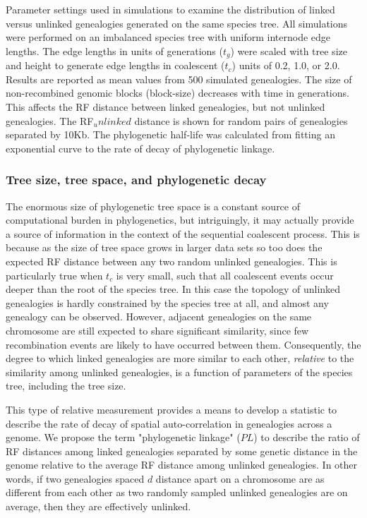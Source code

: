 \documentclass[11pt]{article}
\begin{document}
\begin{table}
\begin{center}
\end{center}
\caption{
	Parameter settings used in simulations to examine the distribution of 
	linked versus unlinked genealogies generated on the same species tree.
	All simulations were performed on an imbalanced species tree with uniform 
	internode edge lengths. The edge lengths in units of generations ($t_g$) 
	were scaled with tree size and height to generate edge lengths in 
	coalescent ($t_c$) units of 0.2, 1.0, or 2.0. Results are reported as mean values from 500 simulated 
	genealogies. The size of non-recombined genomic	blocks (block-size) decreases with time in generations. This affects the RF distance between linked genealogies, but not unlinked genealogies. The RF$_unlinked$ distance is shown for random pairs of genealogies separated by 10Kb. The phylogenetic half-life was calculated from fitting an exponential curve to the rate of decay of phylogenetic linkage.
}
\end{table}

\subsubsection{Tree size, tree space, and phylogenetic decay}
The enormous size of phylogenetic tree space is a constant source of computational burden in phylogenetics, but intriguingly, it may actually provide a source of information in the context of the sequential coalescent process. This is because as the size of tree space grows in larger data sets so too does the expected RF distance between any two random unlinked genealogies. This is particularly true when $t_c$ is very small, such that all coalescent events occur deeper than the root of the species tree. In this case the topology of unlinked genealogies is hardly constrained by the species tree at all, and almost any genealogy can be observed. However, adjacent genealogies on the same chromosome are still expected to share significant similarity, since few recombination events are likely to have occurred between them.  Consequently, the degree to which linked genealogies are more similar to each other, \emph{relative} to the similarity among unlinked genealogies, is a function of parameters of the species tree, including the tree size.

This type of relative measurement provides a means to develop a statistic to describe the rate of decay of spatial auto-correlation in genealogies across a genome. We propose the term "phylogenetic linkage" ($PL$) to describe the ratio of RF distances among linked genealogies separated by some genetic distance in the genome relative to the average RF distance among unlinked genealogies. In other words, if two genealogies spaced $d$ distance apart on a chromosome are as different from each other as two randomly sampled unlinked genealogies are on average, then they are effectively unlinked. 
\end{document}

